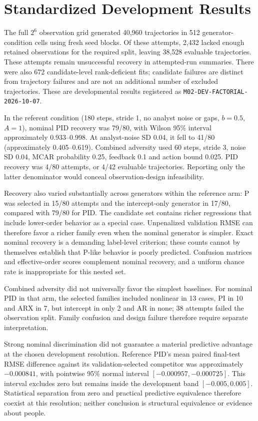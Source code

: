 \section{Standardized Development Results}

The full $2^6$ observation grid generated 40,960 trajectories in 512 generator-condition cells using fresh seed blocks. Of these attempts, 2,432 lacked enough retained observations for the required split, leaving 38,528 evaluable trajectories. These attempts remain unsuccessful recovery in attempted-run summaries. There were also 672 candidate-level rank-deficient fits; candidate failures are distinct from trajectory failures and are not an additional number of excluded trajectories. These are developmental results registered as \texttt{M02-DEV-FACTORIAL-2026-10-07}.



In the referent condition (180 steps, stride 1, no analyst noise or gaps, $b=0.5$, $A=1$), nominal PID recovery was 79/80, with Wilson 95\% interval approximately 0.933--0.998. At analyst-noise SD 0.04, it fell to 41/80 (approximately 0.405--0.619). Combined adversity used 60 steps, stride 3, noise SD 0.04, MCAR probability 0.25, feedback 0.1 and action bound 0.025. PID recovery was 4/80 attempts, or 4/42 evaluable trajectories. Reporting only the latter denominator would conceal observation-design infeasibility.

Recovery also varied substantially across generators within the reference arm: P was selected in 15/80 attempts and the intercept-only generator in 17/80, compared with 79/80 for PID. The candidate set contains richer regressions that include lower-order behavior as a special case. Unpenalized validation RMSE can therefore favor a richer family even when the nominal generator is simpler. Exact nominal recovery is a demanding label-level criterion; these counts cannot by themselves establish that P-like behavior is poorly predicted. Confusion matrices and effective-order scores complement nominal recovery, and a uniform chance rate is inappropriate for this nested set.

Combined adversity did not universally favor the simplest baselines. For nominal PID in that arm, the selected families included nonlinear in 13 cases, PI in 10 and ARX in 7, but intercept in only 2 and AR in none; 38 attempts failed the observation split. Family confusion and design failure therefore require separate interpretation.

Strong nominal discrimination did not guarantee a material predictive advantage at the chosen development resolution. Reference PID's mean paired final-test RMSE difference against its validation-selected competitor was approximately $-0.000841$, with pointwise 95\% normal interval $[-0.000957,-0.000725]$. This interval excludes zero but remains inside the development band $[-0.005,0.005]$. Statistical separation from zero and practical predictive equivalence therefore coexist at this resolution; neither conclusion is structural equivalence or evidence about people.

